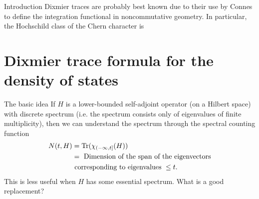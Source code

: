 \documentclass{beamer}
\numberwithin{equation}{section}
\theoremstyle{plain}
\theoremstyle{plain}
\theoremstyle{definition}
\theoremstyle{plain}
\theoremstyle{plain}
\theoremstyle{definition}
\newcommand{\tr}{{\rm Tr}}
\newcommand{\Vol}{\mathrm{Vol}}
\newcommand{\Rl}{\mathbb{R}}
\begin{document}
\begin{frame}{Introduction}
    Dixmier traces are probably best known due to their use by Connes to define the integration functional
    in noncommutative geometry. In particular, the Hochschild class of the Chern character is 
    
\end{frame}

\section{Dixmier trace formula for the density of states}
% 
\begin{frame}{The basic idea}
    If $H$ is a lower-bounded self-adjoint operator (on a Hilbert space) with discrete spectrum (i.e. the spectrum consists only of eigenvalues of finite multiplicity), then we can understand the spectrum through the spectral counting function
    \begin{align*}
        N(t,H) &= \tr(\chi_{(-\infty,t]}(H))\\
                     &= \text{ Dimension of the span of the eigenvectors}\\
                     &\text{ corresponding to eigenvalues }\leq t.
    \end{align*}
    This is less useful when $H$ has some essential spectrum. What is a good replacement?

\end{frame} 
% 
\end{document}
